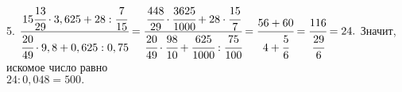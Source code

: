 5. $\cfrac{15\cfrac{13}{29}\cdot3,625+28:\cfrac{7}{15}}{\cfrac{20}{49}\cdot9,8+0,625:0,75}=\cfrac{\cfrac{448}{29}\cdot\cfrac{3625}{1000}+28\cdot\cfrac{15}{7}}{\cfrac{20}{49}\cdot\cfrac{98}{10}+\cfrac{625}{1000}:\cfrac{75}{100}}=
\cfrac{56+60}{4+\cfrac{5}{6}}=\cfrac{116}{\cfrac{29}{6}}=24.$ Значит, искомое число равно \\$24:0,048=500.$\\
